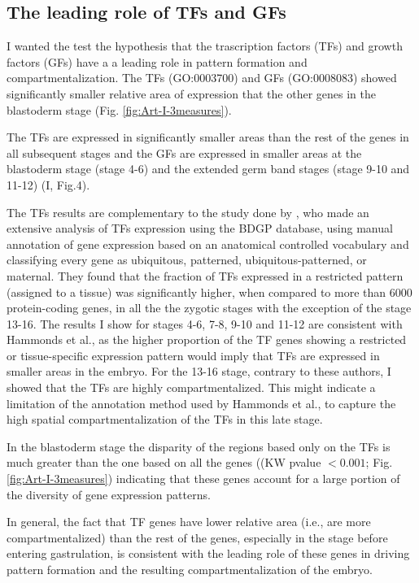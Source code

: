 \subsection{The leading role of TFs and GFs}

I wanted the test the hypothesis that the trascription factors (TFs) and growth factors (GFs) have a a leading role in pattern formation and compartmentalization.
The TFs (GO:0003700) and GFs (GO:0008083) showed significantly smaller relative area of expression that the other genes in the blastoderm stage (Fig. \ref{fig:Art-I-3measures}).
	
The TFs are expressed in significantly smaller areas than the rest of the genes in all subsequent stages and the GFs are expressed in smaller areas at the blastoderm stage (stage 4-6) and the extended germ band stages (stage 9-10 and 11-12) (I, Fig.4).

The TFs results are complementary to the study done by \citet{Hammonds2013}, who made an extensive analysis of TFs expression using the BDGP database, using manual annotation of gene expression based on an anatomical controlled vocabulary and classifying every gene as ubiquitous, patterned, ubiquitous-patterned, or maternal. 
They found that the fraction of TFs expressed in a restricted pattern (assigned to a tissue) was significantly higher, when compared to more than 6000 protein-coding genes, in all the the zygotic stages with the exception of the stage 13-16. The results I show for stages 4-6, 7-8, 9-10 and 11-12 are consistent with Hammonds et al., as the higher proportion of the TF genes showing a restricted or tissue-specific expression pattern would imply that TFs are expressed in smaller areas in the embryo. 
For the 13-16 stage, contrary to these authors, I showed that the TFs are highly compartmentalized. This might indicate a limitation of the annotation method used by Hammonds et al., to capture the high spatial compartmentalization of the TFs in this late stage.

In the blastoderm stage the disparity of the regions based only on the TFs is much greater than the one based on all the genes ((KW pvalue $<0.001$; Fig. \ref{fig:Art-I-3measures}) indicating that these genes account for a large portion of the diversity of gene expression patterns.

In general, the fact that TF genes have lower relative area (i.e., are more compartmentalized) than the rest of the genes, especially in the stage before entering gastrulation, is consistent with the leading role of these genes in driving pattern formation and the resulting compartmentalization of the embryo.

